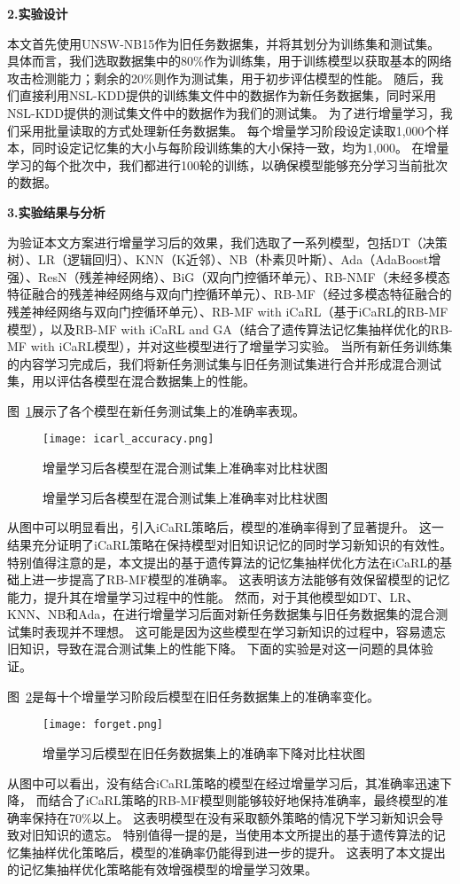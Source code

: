 \textbf{2.实验设计}\par
本文首先使用UNSW-NB15作为旧任务数据集，并将其划分为训练集和测试集。
具体而言，我们选取数据集中的80\%作为训练集，用于训练模型以获取基本的网络攻击检测能力；剩余的20\%则作为测试集，用于初步评估模型的性能。
随后，我们直接利用NSL-KDD提供的训练集文件中的数据作为新任务数据集，同时采用NSL-KDD提供的测试集文件中的数据作为我们的测试集。
为了进行增量学习，我们采用批量读取的方式处理新任务数据集。
每个增量学习阶段设定读取1,000个样本，同时设定记忆集的大小与每阶段训练集的大小保持一致，均为1,000。
在增量学习的每个批次中，我们都进行100轮的训练，以确保模型能够充分学习当前批次的数据。\par

\textbf{3.实验结果与分析}\par
为验证本文方案进行增量学习后的效果，我们选取了一系列模型，包括DT（决策树）、LR（逻辑回归）、KNN（K近邻）、NB（朴素贝叶斯）、Ada（AdaBoost增强）、ResN（残差神经网络）、BiG（双向门控循环单元）、RB-NMF（未经多模态特征融合的残差神经网络与双向门控循环单元）、RB-MF（经过多模态特征融合的残差神经网络与双向门控循环单元）、RB-MF with iCaRL（基于iCaRL的RB-MF模型），以及RB-MF with iCaRL and GA（结合了遗传算法记忆集抽样优化的RB-MF with iCaRL模型），并对这些模型进行了增量学习实验。
当所有新任务训练集的内容学习完成后，我们将新任务测试集与旧任务测试集进行合并形成混合测试集，用以评估各模型在混合数据集上的性能。\par

图~\ref{fig:acc_icarl}展示了各个模型在新任务测试集上的准确率表现。
\begin{figure}[h]
	\centering
	\texttt{[image: icarl\_accuracy.png]}
	\caption{增量学习后各模型在混合测试集上准确率对比柱状图}
	\caption{增量学习后各模型在混合测试集上准确率对比柱状图}
	\label{fig:acc_icarl}
\end{figure}
从图中可以明显看出，引入iCaRL策略后，模型的准确率得到了显著提升。
这一结果充分证明了iCaRL策略在保持模型对旧知识记忆的同时学习新知识的有效性。
特别值得注意的是，本文提出的基于遗传算法的记忆集抽样优化方法在iCaRL的基础上进一步提高了RB-MF模型的准确率。
这表明该方法能够有效保留模型的记忆能力，提升其在增量学习过程中的性能。
然而，对于其他模型如DT、LR、KNN、NB和Ada，在进行增量学习后面对新任务数据集与旧任务数据集的混合测试集时表现并不理想。
这可能是因为这些模型在学习新知识的过程中，容易遗忘旧知识，导致在混合测试集上的性能下降。
下面的实验是对这一问题的具体验证。

图~\ref{fig:acc_forget}是每十个增量学习阶段后模型在旧任务数据集上的准确率变化。
\begin{figure}[h]
	\centering
	\texttt{[image: forget.png]}
	\caption{增量学习后模型在旧任务数据集上的准确率下降对比柱状图}
	\label{fig:acc_forget}
\end{figure}
\par
从图中可以看出，没有结合iCaRL策略的模型在经过增量学习后，其准确率迅速下降，
而结合了iCaRL策略的RB-MF模型则能够较好地保持准确率，最终模型的准确率保持在70\%以上。
这表明模型在没有采取额外策略的情况下学习新知识会导致对旧知识的遗忘。
特别值得一提的是，当使用本文所提出的基于遗传算法的记忆集抽样优化策略后，模型的准确率仍能得到进一步的提升。
这表明了本文提出的记忆集抽样优化策略能有效增强模型的增量学习效果。

